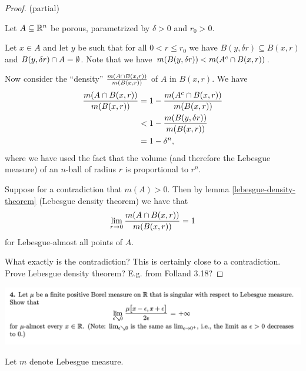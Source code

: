 \begin{proof}
   (partial)

  Let $A \subseteq \mathbb{R}^n$ be porous, parametrized by $\delta > 0$ and $r_0 > 0$.

  Let $x \in A$ and let $y$ be such that for all $0 < r \leq r_0$ we have $B(y, \delta r) \subseteq B(x, r)$
  and $B(y, \delta r) \cap A = \emptyset$. Note that we have $m(B(y, \delta r)) < m(A^c \cap B(x, r))$.

  Now consider the ``density​'' $\frac{m(A \cap B(x, r))}{m(B(x, r))}$ of $A$ in $B(x, r)$. We have
  \begin{align*}
    \frac{m(A \cap B(x, r))}{m(B(x, r))}
    &= 1 - \frac{m(A^c \cap B(x, r))}{m(B(x, r))} \\
    &< 1 - \frac{m(B(y, \delta r))}{m(B(x, r))} \\
    &= 1 - \delta^n,
  \end{align*}
  where we have used the fact that the volume (and therefore the Lebesgue measure) of an $n$-ball of radius $r$
  is proportional to $r^n$.

  Suppose for a contradiction that $m(A) > 0$. Then by lemma \ref{lebesgue-density-theorem} (Lebesgue density
  theorem) we have that
  \begin{align*}
    \lim_{r \to 0} \frac{m(A \isect B(x, r))}{m(B(x, r))} = 1
  \end{align*}
  for Lebesgue-almost all points of $A$.

   What exactly is the contradiction? This is certainly close to a contradiction.
   Prove Lebesgue density theorem? E.g. from Folland 3.18?

\end{proof}



\newpage
\begin{mdframed}
\includegraphics[width=400pt]{img/analysis--berkeley-202a-final-21a6.png}
\end{mdframed}

Let $m$ denote Lebesgue measure.

